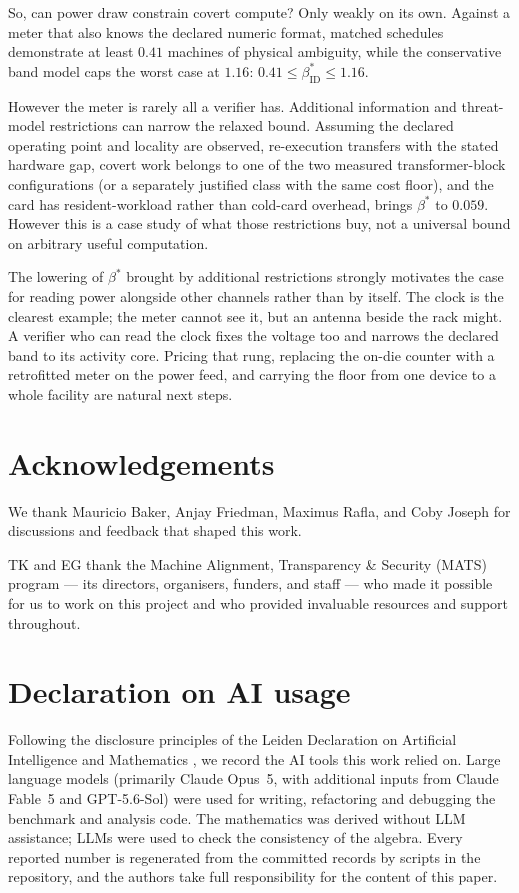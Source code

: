 \documentclass{article}
\theoremstyle{plain}
\theoremstyle{definition}
\theoremstyle{remark}
\begin{document}
So, can power draw constrain covert compute? Only weakly on its
own. Against a meter that also knows the declared numeric format, matched
schedules demonstrate at least $0.41$ machines of physical ambiguity, while
the conservative band model caps the worst case at $1.16$:
$0.41 \leq \beta_{\mathrm{ID}}^{*} \leq 1.16$.

However the meter is rarely all a verifier has. Additional information and threat-model restrictions can narrow the relaxed
bound. Assuming the declared operating point and locality are observed, re-execution transfers
with the stated hardware gap, covert work belongs to one of the two measured
transformer-block configurations (or a separately justified class with the
same cost floor), and the card has resident-workload rather than cold-card
overhead, brings $\beta^{*}$ to $0.059$. However this is a case study of what those restrictions buy, not a universal
bound on arbitrary useful computation.

The lowering of $\beta^{*}$ brought by additional restrictions strongly motivates the case for reading power alongside other channels rather than by itself. The clock is the clearest example; the meter cannot see it, but an
antenna beside the rack might. A verifier who can read the clock fixes the voltage
too and narrows the declared band to its activity core. Pricing that rung,
replacing the on-die counter with a retrofitted meter on the power feed, and
carrying the floor from one device to a whole facility are natural next steps.

\section*{Acknowledgements}

We thank Mauricio Baker, Anjay Friedman, Maximus Rafla, and Coby Joseph for
discussions and feedback that shaped this work.

TK and EG thank the Machine Alignment, Transparency \& Security (MATS) program --- its
directors, organisers, funders, and staff --- who made it possible for us to
work on this project and who provided invaluable resources and support
throughout.
\newpage
\section*{Declaration on AI usage}
Following the disclosure principles of the Leiden Declaration on Artificial
Intelligence and Mathematics \citep{alper2026leiden}, we record the AI tools
this work relied on. Large language models (primarily Claude Opus~5, with additional inputs from Claude Fable~5 and
GPT-5.6-Sol) were used for writing,
refactoring and debugging the benchmark and analysis code. The mathematics was derived without LLM assistance; LLMs were used to check the consistency of the algebra. Every reported number is regenerated from the committed records by scripts in the repository, and the authors take full
responsibility for the content of this paper.
\end{document}
